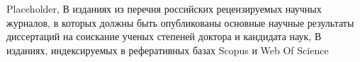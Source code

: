 \geometry{a4paper,top=2cm,bottom=2cm,left=25mm,right=1cm}


\sloppy					%

\makeatletter
\def\bbl@main@language{russian}
\renewcommand{\@biblabel}[1]{#1.}	%
\makeatother

%
  {Placeholder,%
  {\large В изданиях из перечня российских рецензируемых научных %
  журналов, в которых должны быть опубликованы основные научные результаты %
  диссертаций на соискание ученых степеней доктора и кандидата наук},%
  {\large В изданиях, индексируемых в реферативных базах Scopus и Web Of Science}}


\graphicspath{{images/}} %



\tabulinesep=1.2mm

\linespread{1.3}

\setlength{\headheight}{15pt}

\fancyhf{}
\fancyhead[C]{\thepage}
\pagestyle{fancy}
\renewcommand{\headrulewidth}{0pt}



\titleformat{\chapter}[display]
  {\normalfont\large\bfseries\filcenter}{\chaptertitlename\ \thechapter}{20pt}{\Large}